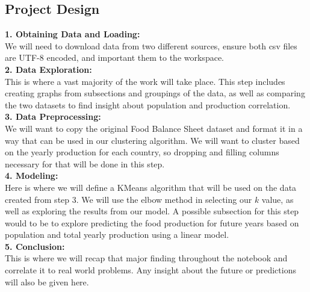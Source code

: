 \documentclass[12pt, a4paper]{article}
\begin{document}
\begin{spacing}{1.1}
	\section{Project Design}
	\textbf{1. Obtaining Data and Loading:} \\
	We will need to download data from two different sources, ensure both csv files are UTF-8 encoded, and important them to the workspace.\vspace*{2mm}\\
	\textbf{2. Data Exploration:}\\
	This is where a vast majority of the work will take place. This step includes creating graphs from subsections and groupings of the data, as well as comparing the two datasets to find insight about population and production correlation. \vspace*{2mm}\\
	\textbf{3. Data Preprocessing:}\\
	We will want to copy the original Food Balance Sheet dataset and format it in a way that can be used in our clustering algorithm. We will want to cluster based on the yearly production for each country, so dropping and filling columns necessary for that will be done in this step.\vspace*{2mm}\\
	\textbf{4. Modeling:}\\
	Here is where we will define a KMeans algorithm that will be used on the data created from step 3. We will use the elbow method in selecting our $k$ value, as well as exploring the results from our model. A possible subsection for this step would to be to explore predicting the food production for future years based on population and total yearly production using a linear model.\vspace*{2mm}\\
	\textbf{5. Conclusion:}\\
	This is where we will recap that major finding throughout the notebook and correlate it to real world problems. Any insight about the future or predictions will also be given here. \newpage
	
	

\end{spacing}
\end{document}
